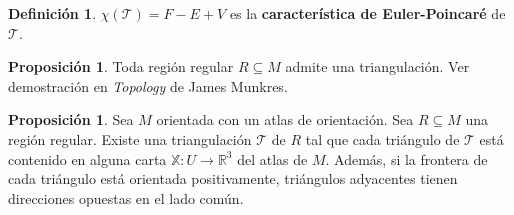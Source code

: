 \documentclass[twoside]{report}
\theoremstyle{definition}
\newtheorem{defi}[theorem]{Definición}
\newtheorem{prop}[theorem]{Proposición}
\numberwithin{equation}{section}
\newcommand{\R}{\mathbb{R}}
\newcommand{\X}{\mathbb{X}}
\begin{document}
\begin{defi}
$χ(\mathcal{T}) = F -E + V $ es la \textbf{característica de Euler-Poincaré} de $\mathcal{T}$.
\end{defi}

\begin{prop}
Toda región regular $R \subseteq M$ admite una triangulación. Ver demostración en \textit{Topology} de James Munkres.
\end{prop}

\begin{prop} Sea $M$ orientada con un atlas de orientación. Sea $R \subseteq M$ una región regular. Existe una triangulación $\mathcal{T}$ de $R$ tal que cada triángulo de $\mathcal{T}$ está contenido en alguna carta $\X : U \to \R^3$ del atlas de $M$. Además, si la frontera de cada triángulo está orientada positivamente, triángulos adyacentes tienen direcciones opuestas en el lado común.
\end{prop}
\end{document}
